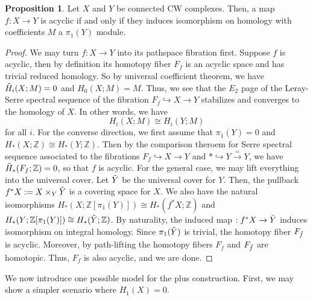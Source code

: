 \documentclass{article}
\theoremstyle{definition}
\theoremstyle{definition}
\theoremstyle{definition}
\theoremstyle{definition}
\newtheorem{proposition}{Proposition}[theorem]
\theoremstyle{definition}
\theoremstyle{definition}
\theoremstyle{definition}
\begin{document}
\begin{tcolorbox}[colback=blue!5!white,colframe=blue!30!white]
\begin{proposition}
    Let $X$ and $Y$ be connected CW complexes. Then, a map $f:X\xrightarrow{}Y$ is acyclic if and only if they induces isomorphism on homology with coefficients $M$ a $\pi_1(Y)$ module.
\end{proposition}
\end{tcolorbox}

\begin{proof}
We may turn $f:X\xrightarrow{}Y$ into its pathspace fibration first. Suppose $f$ is acyclic, then by definition its homotopy fiber $F_f$ is an acyclic space and has trivial reduced homology. So by universal coefficient theorem, we have $\Tilde{H}_i(X;M)=0$ and $H_0(X;M)=M$. Thus, we see that the $E_2$ page of the Leray-Serre spectral sequence of the fibration $F_f\hookrightarrow X\xrightarrow{}Y$ stabilizes and converges to the homology of $X$. In other words, we have
\[
H_i(X;M)\cong H_i(Y;M)
\]
for all $i$.
For the converse direction, we first assume that $\pi_1 (Y)=0$ and $H_*(X;\mathbb{Z})\cong H_*(Y;\mathbb{Z})$. Then by the comparison theroem for Serre spectral sequence associated to the fibrations $F_f\hookrightarrow{}X\xrightarrow{}Y$ and $*\hookrightarrow Y\xrightarrow{=}Y$, we have $\Tilde{H}_*(F_f;\mathbb{Z})=0$, so that $f$ is acyclic. For the general case, we may lift everything into the universal cover. Let $\Tilde{Y}$ be the universal cover for $Y$. Then, the pullback $f^*X:=X\times_Y \Tilde{Y}$ is a covering space for $X$. We also have the natural isomorphisms $H_*(X;\mathbb{Z}[\pi_1(Y)])\cong H_*(f^*X;\mathbb{Z})$ and $H_*(Y;\mathbb{Z}[\pi_1(Y)])\cong H_*(\Tilde{Y};\mathbb{Z})$. By naturality, the induced map $\title{f}:f^*X\xrightarrow{}\Tilde{Y}$ induces isomorphism on integral homology. Since $\pi_1(\Tilde{Y})$ is trivial, the homotopy fiber $F_{\Tilde{f}}$ is acyclic. Moreover, by path-lifting the homotopy fibers $F_f$ and $F_{\Tilde{f}}$ are homotopic. Thus, $F_f$ is also acyclic, and we are done. 
\end{proof}
We now introduce one possible model for the plus construction. First, we may show a simpler scenario where $H_1(X)=0$. 
\end{document}
